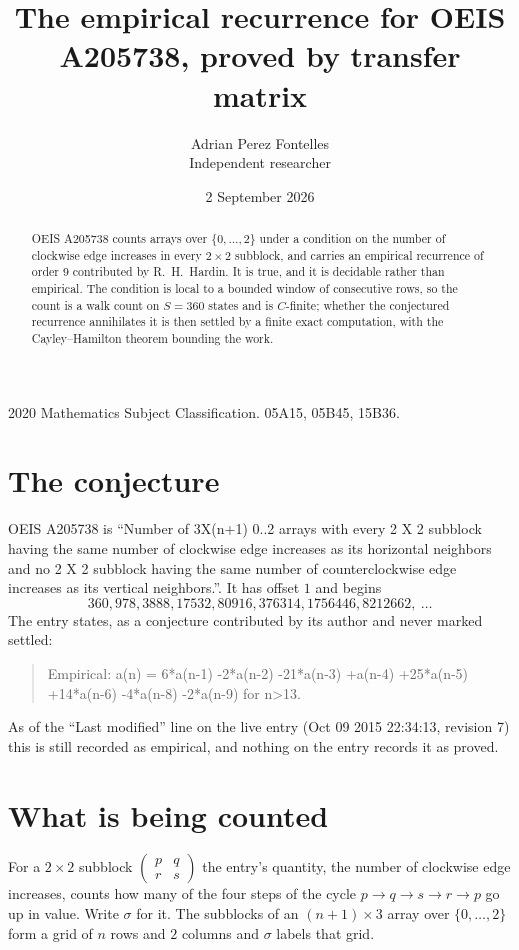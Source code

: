 \documentclass[11pt,a4paper]{article}
\title{The empirical recurrence for OEIS A205738, proved by transfer matrix}
\author{Adrian Perez Fontelles\\ \small Independent researcher}
\date{2 September 2026}
\theoremstyle{plain}
\theoremstyle{definition}
\begin{document}
\maketitle

\begin{abstract}
OEIS A205738 counts arrays over $\{0,\dots,2\}$ under a condition on the number of clockwise edge increases
in every $2\times2$ subblock, and carries an empirical recurrence of order $9$ contributed by
R.~H.~Hardin. It is true, and it is decidable rather than empirical. The condition is local to
a bounded window of consecutive rows, so the count is a walk count on $S=360$ states and is
$C$-finite; whether the conjectured recurrence annihilates it is then settled by a finite exact
computation, with the Cayley--Hamilton theorem bounding the work.
\end{abstract}

\noindent\small 2020 Mathematics Subject Classification. 05A15, 05B45, 15B36.\normalsize

\section{The conjecture}

OEIS A205738 is ``Number of 3X(n+1) 0..2 arrays with every 2 X 2 subblock having the same number of clockwise edge increases as its horizontal neighbors and no 2 X 2 subblock having the same number of counterclockwise edge increases as its vertical neighbors.''. It has offset $1$ and begins
\[
360, 978, 3888, 17532, 80916, 376314, 1756446, 8212662,\ \dots
\]
The entry states, as a conjecture contributed by its author and never marked settled:
\begin{quote}
Empirical: a(n) = 6*a(n-1) -2*a(n-2) -21*a(n-3) +a(n-4) +25*a(n-5) +14*a(n-6) -4*a(n-8) -2*a(n-9) for n>13.
\end{quote}
As of the ``Last modified'' line on the live entry (Oct 09 2015 22:34:13, revision 7) this is still
recorded as empirical, and nothing on the entry records it as proved.

\section{What is being counted}

For a $2\times2$ subblock $\begin{pmatrix}p&q\\r&s\end{pmatrix}$ the
entry's quantity, the number of clockwise edge increases, counts how many of the four steps of the cycle $p\to q\to s\to r\to p$ go up in value. Write $\sigma$ for it. The subblocks of an
$(n+1)\times3$ array over $\{0,\dots,2\}$ form a grid of $n$ rows and $2$
columns and $\sigma$ labels that grid.
\end{document}
